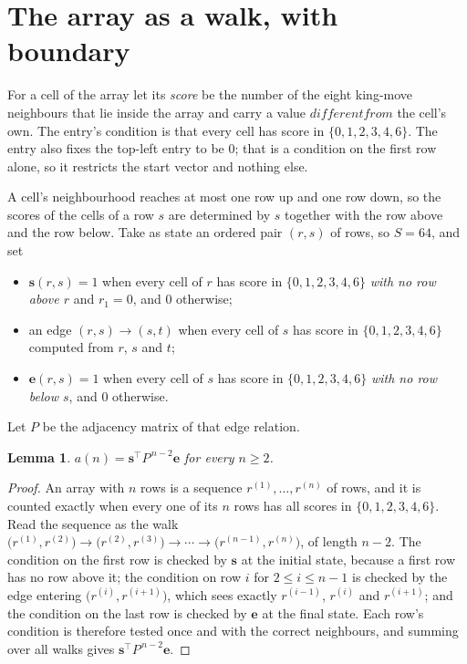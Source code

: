 \documentclass[11pt,a4paper]{article}
\theoremstyle{plain}
\newtheorem{lemma}[theorem]{Lemma}
\theoremstyle{definition}
\begin{document}
\section{The array as a walk, with boundary}

For a cell of the array let its \emph{score} be the number of the eight king-move neighbours that lie inside
the array and carry a value $different from$ the cell's own. The entry's condition is that every cell
has score in $\{0,1,2,3,4,6\}$. The entry also fixes the top-left entry to be $0$; that is a condition on the first row alone, so it restricts the start vector and nothing else.

A cell's neighbourhood reaches at most one row up and one row down, so the scores of the
cells of a row $s$ are determined by $s$ together with the row above and the row below.
Take as state an ordered pair $(r,s)$ of rows, so $S=64$, and set
\begin{itemize}
\item $\mathbf{s}(r,s)=1$ when every cell of $r$ has score in $\{0,1,2,3,4,6\}$ \emph{with no row
above $r$} and $r_1=0$, and $0$ otherwise;
\item an edge $(r,s)\to(s,t)$ when every cell of $s$ has score in $\{0,1,2,3,4,6\}$ computed from
$r$, $s$ and $t$;
\item $\mathbf{e}(r,s)=1$ when every cell of $s$ has score in $\{0,1,2,3,4,6\}$ \emph{with no row
below $s$}, and $0$ otherwise.
\end{itemize}
Let $P$ be the adjacency matrix of that edge relation.

\begin{lemma}\label{lem:walk}
$a(n)=\mathbf{s}^{\!\top}P^{\,n-2}\mathbf{e}$ for every $n\ge2$.
\end{lemma}

\begin{proof}
An array with $n$ rows is a sequence $r^{(1)},\dots,r^{(n)}$ of rows, and it is counted
exactly when every one of its $n$ rows has all scores in $\{0,1,2,3,4,6\}$. Read the sequence as the
walk $\bigl(r^{(1)},r^{(2)}\bigr)\to\bigl(r^{(2)},r^{(3)}\bigr)\to\cdots\to
\bigl(r^{(n-1)},r^{(n)}\bigr)$, of length $n-2$. The condition on the first row is
checked by $\mathbf{s}$ at the initial state, because a first row has no row above it; the
condition on row $i$ for $2\le i\le n-1$ is checked by the edge entering
$\bigl(r^{(i)},r^{(i+1)}\bigr)$, which sees exactly $r^{(i-1)}$, $r^{(i)}$ and
$r^{(i+1)}$; and the condition on the last row is checked by $\mathbf{e}$ at the final
state. Each row's condition is therefore tested once and with the correct neighbours, and
summing over all walks gives $\mathbf{s}^{\!\top}P^{\,n-2}\mathbf{e}$.
\end{proof}
\end{document}
